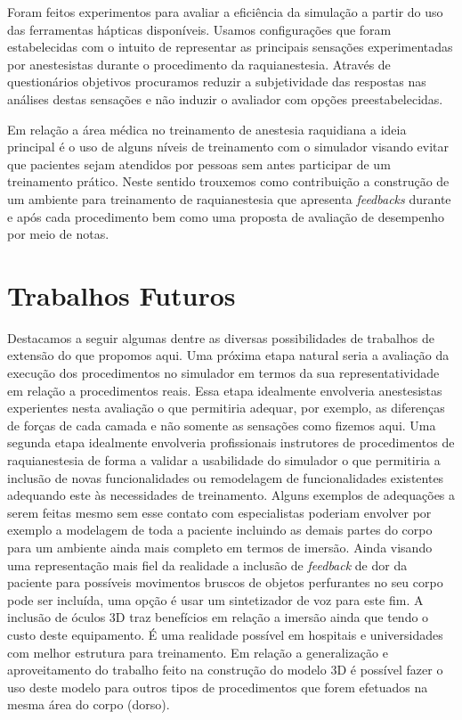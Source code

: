 Foram feitos experimentos para avaliar a eficiência da simulação a partir do uso das ferramentas hápticas disponíveis. Usamos configurações que foram estabelecidas com o intuito de representar as principais sensações experimentadas por anestesistas durante o procedimento da raquianestesia. Através de questionários objetivos  procuramos reduzir a subjetividade das respostas nas análises destas sensações e não induzir o avaliador com opções preestabelecidas.  

Em relação a área médica no treinamento de anestesia raquidiana a ideia principal é o uso de alguns níveis de treinamento com o simulador visando evitar que pacientes sejam atendidos por pessoas sem antes participar de um treinamento prático. Neste sentido trouxemos como contribuição a construção de um ambiente para treinamento de raquianestesia que apresenta \textit{feedbacks} durante e após cada procedimento bem como uma proposta de avaliação de desempenho por meio de notas. 

\section{Trabalhos Futuros}
\label{sec:trabFuturo}

Destacamos a seguir algumas dentre as diversas possibilidades de trabalhos de extensão do que propomos aqui. Uma próxima etapa natural seria a avaliação da execução dos procedimentos no simulador em termos da sua representatividade em relação a procedimentos reais. Essa etapa idealmente envolveria anestesistas experientes nesta avaliação o que permitiria adequar, por exemplo, as diferenças de forças de cada camada e não somente as sensações como fizemos aqui. Uma segunda etapa idealmente envolveria profissionais instrutores de procedimentos de raquianestesia de forma a validar a usabilidade do simulador o que permitiria a inclusão de novas funcionalidades ou remodelagem de funcionalidades existentes adequando este às necessidades de treinamento. Alguns exemplos de adequações a serem feitas mesmo sem esse contato com especialistas poderiam envolver por exemplo a modelagem de toda a paciente incluindo as demais partes do corpo para um ambiente ainda mais completo em termos de imersão. Ainda visando uma representação mais fiel da realidade a inclusão de \textit{feedback} de dor da paciente para possíveis movimentos bruscos de objetos perfurantes no seu corpo pode ser incluída, uma opção é usar um sintetizador de voz para este fim. A inclusão de óculos 3D traz benefícios em relação a imersão ainda que tendo o custo deste equipamento. É uma realidade possível em hospitais e universidades com melhor estrutura para treinamento.
Em relação a generalização e aproveitamento do trabalho feito na construção do modelo 3D é possível fazer o uso deste modelo para outros tipos de procedimentos que forem efetuados na mesma área do corpo (dorso). 

